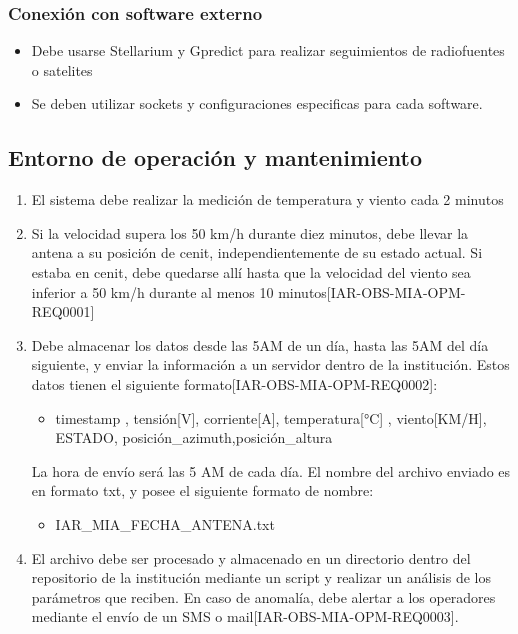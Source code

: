 \documentclass[12pt,a4paper, twosite]{article}
\begin{document}
\subsubsection{Conexión con software externo}
	\begin{itemize}
		\item Debe usarse Stellarium y Gpredict para realizar seguimientos de radiofuentes o satelites
		\item Se deben utilizar sockets y configuraciones especificas para cada software. 
	\end{itemize}


\subsection{Entorno de operación y mantenimiento}
\begin{enumerate}
	\item El sistema debe realizar la medición de temperatura y viento cada 2 minutos 
	\item Si la velocidad supera los 50 km/h durante diez minutos, debe llevar la antena a su posición de cenit, independientemente de su estado actual. Si estaba en cenit, debe quedarse allí hasta que la velocidad del viento sea inferior a 50 km/h durante al menos 10 minutos[IAR-OBS-MIA-OPM-REQ0001]
	\item Debe almacenar los datos desde las 5AM de un día, hasta las 5AM del día siguiente, y enviar la información a un servidor dentro de la institución. Estos datos tienen el siguiente formato[IAR-OBS-MIA-OPM-REQ0002]: 
	\begin{itemize}
		\item timestamp , tensión[V], corriente[A], temperatura[°C] , viento[KM/H], ESTADO, posición\_azimuth,posición\_altura 
	\end{itemize}  
	La hora de envío será las 5 AM de cada día. El nombre del archivo enviado es en formato txt, y posee el siguiente formato de nombre: 
	\begin{itemize}
		\item IAR\_MIA\_FECHA\_ANTENA.txt 
	\end{itemize} 
	\item El archivo debe ser procesado y almacenado en un directorio dentro del repositorio de la institución mediante un script y realizar un análisis de los parámetros que reciben. En caso de anomalía, debe alertar a los operadores mediante el envío de un SMS o mail[IAR-OBS-MIA-OPM-REQ0003].  
\end{enumerate}
\end{document}
